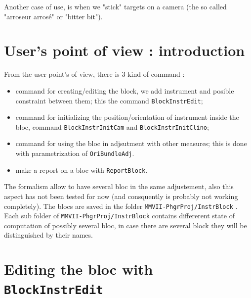 Another case of use, is when we "stick" targets on a camera (the so called 
"arroseur arros\'e" or "bitter bit").
\COM
{
}


\section{User's point of view : introduction}


From the user point's of view, there is $3$ kind of command :

\begin{itemize}
    \item  command for creating/editing  the block, we add instrument and posible
	    constraint between them; this the command {\tt BlockInstrEdit};

    \item  command for initializing the position/orientation  of instrument  inside the bloc,
            command {\tt BlockInstrInitCam} and {\tt   BlockInstrInitClino};

    \item  command for using the  bloc in adjsutment with other measures;
           this is done with parametrization of {\tt OriBundleAdj}.

    \item  make a report on a bloc with {\tt ReportBlock}.
\end{itemize}

The formalism allow to have several bloc in the same adjustement, also this aspect has not been tested
for now (and consquently is probably not working completely).
The blocs are saved in the folder {\tt MMVII-PhgrProj/InstrBlock} . Each sub folder
of  {\tt MMVII-PhgrProj/InstrBlock} contains differerent state of computation  of possibly
several bloc, in case there are several block they will be distinguished by their names.


\section{Editing the bloc with  {\tt BlockInstrEdit}}

